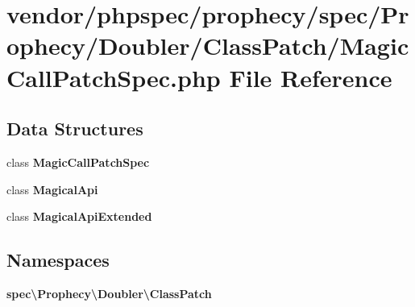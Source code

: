 \section{vendor/phpspec/prophecy/spec/\+Prophecy/\+Doubler/\+Class\+Patch/\+Magic\+Call\+Patch\+Spec.php File Reference}
\label{_magic_call_patch_spec_8php}
\subsection*{Data Structures}
\begin{DoxyCompactItemize}
\item 
class {\bf Magic\+Call\+Patch\+Spec}
\item 
class {\bf Magical\+Api}
\item 
class {\bf Magical\+Api\+Extended}
\end{DoxyCompactItemize}
\subsection*{Namespaces}
\begin{DoxyCompactItemize}
\item 
 {\bf spec\textbackslash{}\+Prophecy\textbackslash{}\+Doubler\textbackslash{}\+Class\+Patch}
\end{DoxyCompactItemize}
